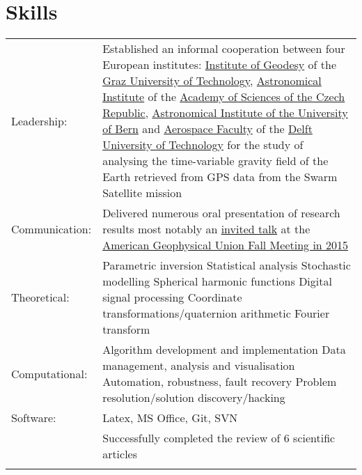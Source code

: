 \documentclass[a4paper]{article}
\newcommand{\procv}[2]{\iftoggle{professionalcv}{#1}{#2}}
\newlength{\listskipbig}
\newenvironment{cvsection}[2]{
  \vspace{0.15in}
  \section*{#1}
  \vspace{-0.2in}
  \begin{longtable}{lp{#2}}
}{
  \end{longtable}
}
\begin{document}

\begin{cvsection}{Skills}{11.2cm}
Leadership: & Established an informal cooperation between four European institutes:\newline
  \href{http://www.itsg.tugraz.at}{Institute of Geodesy} of the \href{http://www.tugraz.at}{Graz University of Technology},\newline
  \href{http://www.asu.cas.cz/en}{Astronomical Institute} of the \href{http://www.cas.cz/index.html}{Academy of Sciences of the Czech Republic},\newline
  \href{http://www.aiub.unibe.ch}{Astronomical Institute of the University of Bern} and\newline
  \href{http://www.lr.tudelft.nl}{Aerospace Faculty} of the \href{http://www.tudelft.nl}{Delft University of Technology}\newline
  for the study of analysing the time-variable gravity field of the Earth retrieved from GPS data from the Swarm Satellite mission\\[\listskipbig]

Communication:  & Delivered numerous oral presentation of research results\newline
                  most notably an \href{http://agu.confex.com/agu/fm15/meetingapp.cgi/Paper/71877}{invited talk} at the \href{http://fallmeeting.agu.org/2015/}{American Geophysical Union Fall Meeting in 2015}\\[\listskipbig]

Theoretical:   & Parametric inversion\newline
                 Statistical analysis\newline
                 Stochastic modelling\newline
                 Spherical harmonic functions\newline
                 Digital signal processing\newline
                 Coordinate transformations\slash quaternion arithmetic\newline
                 Fourier transform\\[\listskipbig]

Computational:  & Algorithm development and implementation\newline
                  Data management, analysis and visualisation\newline
                  Automation, robustness, fault recovery\newline
                  Problem resolution\slash solution discovery\slash hacking\\[\listskipbig]
Software: & Latex, MS Office, Git, SVN\\[\listskipbig]
\procv{}{
Articles review: & Successfully completed the review of 6 scientific articles\\[\listskipbig]
}


\end{cvsection}
\end{document}
